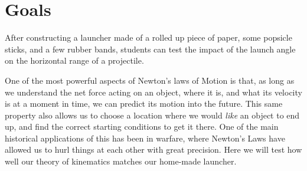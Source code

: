 \renewcommand\thechapter{c1.6a}
\label{lab:ProjectileMotion}

\apparatus
{}

\section*{Goals}

After constructing a launcher made of a rolled up piece of paper, some popsicle sticks, and a few rubber bands, students can test the impact of the launch angle on the horizontal range of a projectile.

\introduction

One of the most powerful aspects of Newton's laws of Motion is that, as long as we understand the net force acting on an object, where it is, and what its velocity is at a moment in time, we can predict its motion into the future. This same property also allows us to choose a location where we would \emph{like} an object to end up, and find the correct starting conditions to get it there.  One of the main historical applications of this has been in warfare, where Newton's Laws have allowed us to hurl things at each other with great precision.  Here we will test how well our theory of kinematics matches our home-made launcher.

\observations


